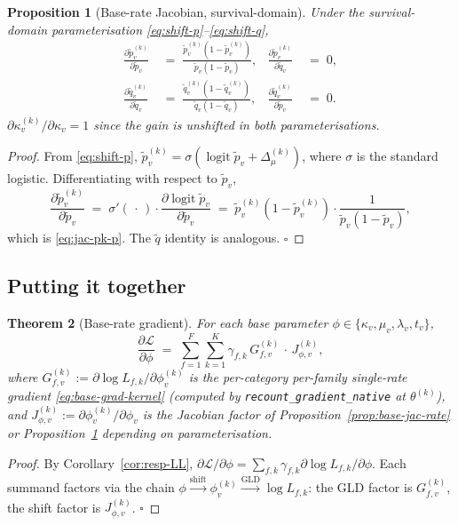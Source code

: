 \documentclass[11pt]{article}
\newcommand{\rate}{\kappa}
\newcommand{\dup}{\lambda}
\newcommand{\loss}{\mu}
\newcommand{\edgelen}{t}
\newcommand{\survp}{\tilde p}
\newcommand{\survq}{\tilde q}
\newcommand{\Ll}{\mathcal{L}}
\DeclareMathOperator{\logit}{logit}
\newtheorem{theorem}{Theorem}
\newtheorem{proposition}[theorem]{Proposition}
\theoremstyle{definition}
\begin{document}
\begin{proposition}[Base-rate Jacobian, survival-domain]
\label{prop:base-jac-surv}
Under the survival-domain parameterisation
\eqref{eq:shift-p}--\eqref{eq:shift-q},
\begin{align}
\frac{\partial \survp^{(k)}_v}{\partial \survp_v}
\;&=\;
\frac{\survp^{(k)}_v (1 - \survp^{(k)}_v)}{\survp_v (1 - \survp_v)},
&
\frac{\partial \survp^{(k)}_v}{\partial \survq_v} \;&=\; 0,
\label{eq:jac-pk-p}\\
\frac{\partial \survq^{(k)}_v}{\partial \survq_v}
\;&=\;
\frac{\survq^{(k)}_v (1 - \survq^{(k)}_v)}{\survq_v (1 - \survq_v)},
&
\frac{\partial \survq^{(k)}_v}{\partial \survp_v} \;&=\; 0.
\label{eq:jac-pk-q}
\end{align}
$\partial \rate^{(k)}_v / \partial \rate_v = 1$ since the gain is
unshifted in both parameterisations.
\end{proposition}
\begin{proof}
From \eqref{eq:shift-p},
$\survp^{(k)}_v = \sigma(\logit \survp_v + \Delta_\loss^{(k)})$,
where $\sigma$ is the standard logistic. Differentiating with
respect to $\survp_v$,
\begin{equation*}
\frac{\partial \survp^{(k)}_v}{\partial \survp_v}
\;=\;
\sigma'(\,\cdot\,) \cdot \frac{\partial \logit \survp_v}{\partial \survp_v}
\;=\;
\survp^{(k)}_v (1 - \survp^{(k)}_v) \cdot \frac{1}{\survp_v (1 - \survp_v)},
\end{equation*}
which is \eqref{eq:jac-pk-p}. The $\survq$ identity is analogous.
$\square$
\end{proof}

\subsection{Putting it together}

\begin{theorem}[Base-rate gradient]\label{thm:base-grad}
For each base parameter $\phi \in \{\rate_v, \loss_v, \dup_v, \edgelen_v\}$,
\begin{equation}
\frac{\partial \Ll}{\partial \phi}
\;=\;
\sum_{f=1}^F \sum_{k=1}^K \gamma_{f,k}\,
   G^{(k)}_{f,v}\, \cdot\, J^{(k)}_{\phi,v},
\label{eq:base-grad}
\end{equation}
where $G^{(k)}_{f,v} := \partial \log L_{f,k} / \partial \phi^{(k)}_v$ is
the per-category per-family single-rate gradient
\eqref{eq:base-grad-kernel} (computed by
\texttt{recount\_gradient\_native} at $\theta^{(k)}$), and
$J^{(k)}_{\phi,v} := \partial \phi^{(k)}_v / \partial \phi_v$ is the
Jacobian factor of Proposition~\ref{prop:base-jac-rate} or
Proposition~\ref{prop:base-jac-surv} depending on parameterisation.
\end{theorem}
\begin{proof}
By Corollary~\ref{cor:resp-LL},
$\partial\Ll/\partial\phi = \sum_{f,k}\gamma_{f,k}\partial\log L_{f,k}/\partial\phi$.
Each summand factors via the chain
$\phi \xrightarrow{\text{shift}} \phi^{(k)}_v \xrightarrow{\text{GLD}}\log L_{f,k}$:
the GLD factor is $G^{(k)}_{f,v}$, the shift factor is
$J^{(k)}_{\phi,v}$. $\square$
\end{proof}
\end{document}
